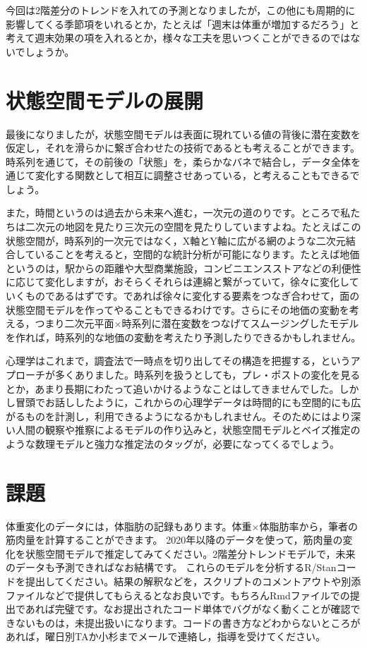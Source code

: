 \documentclass{ltjsbook}
\begin{document}
今回は2階差分のトレンドを入れての予測となりましたが，この他にも周期的に影響してくる季節項をいれるとか，たとえば「週末は体重が増加するだろう」と考えて週末効果の項を入れるとか，様々な工夫を思いつくことができるのではないでしょうか。

\section{状態空間モデルの展開}
最後になりましたが，状態空間モデルは表面に現れている値の背後に潜在変数を仮定し，それを滑らかに繋ぎ合わせたの技術であるとも考えることができます。時系列を通じて，その前後の「状態」を，柔らかなバネで結合し，データ全体を通じて変化する関数として相互に調整させあっている，と考えることもできるでしょう。

また，時間というのは過去から未来へ進む，一次元の道のりです。ところで私たちは二次元の地図を見たり三次元の空間を見たりしていますよね。たとえばこの状態空間が，時系列的一次元ではなく，X軸とY軸に広がる網のような二次元結合していることを考えると，空間的な統計分析が可能になります。たとえば地価というのは，駅からの距離や大型商業施設，コンビニエンスストアなどの利便性に応じて変化しますが，おそらくそれらは連綿と繋がっていて，徐々に変化していくものであるはずです。であれば徐々に変化する要素をつなぎ合わせて，面の状態空間モデルを作ってやることもできるわけです。さらにその地価の変動を考える，つまり二次元平面$\times$時系列に潜在変数をつなげてスムージングしたモデルを作れば，時系列的な地価の変動を考えたり予測したりできるかもしれません。

心理学はこれまで，調査法で一時点を切り出してその構造を把握する，というアプローチが多くありました。時系列を扱うとしても，プレ・ポストの変化を見るとか，あまり長期にわたって追いかけるようなことはしてきませんでした。しかし冒頭でお話ししたように，これからの心理学データは時間的にも空間的にも広がるものを計測し，利用できるようになるかもしれません。そのためにはより深い人間の観察や推察によるモデルの作り込みと，状態空間モデルとベイズ推定のような数理モデルと強力な推定法のタッグが，必要になってくるでしょう。

\section{課題}
体重変化のデータには，体脂肪の記録もあります。体重$\times$体脂肪率から，筆者の筋肉量を計算することができます。
2020年以降のデータを使って，筋肉量の変化を状態空間モデルで推定してみてください。2階差分トレンドモデルで，未来のデータも予測できればなお結構です。
これらのモデルを分析するR/Stanコードを提出してください。結果の解釈などを，スクリプトのコメントアウトや別添ファイルなどで提供してもらえるとなお良いです。もちろんRmdファイルでの提出であれば完璧です。なお提出されたコード単体でバグがなく動くことが確認できないものは，未提出扱いになります。コードの書き方などわからないところがあれば，曜日別TAか小杉までメールで連絡し，指導を受けてください。
\end{document}
